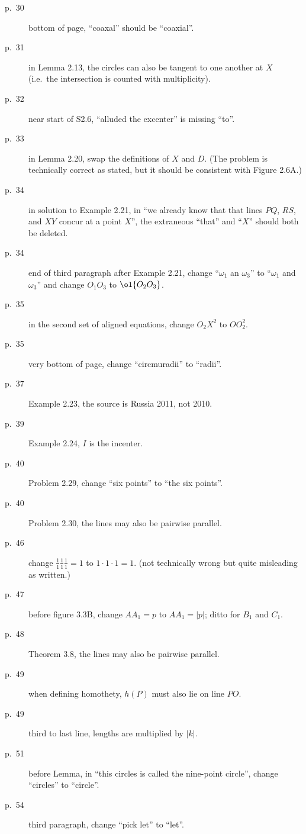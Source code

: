 \documentclass[11pt]{scrartcl}
\begin{document}
\begin{description}
\item[p.\  30] bottom of page, ``coaxal'' should be ``coaxial''.
\item[p.\  31] in Lemma 2.13, the circles can also be tangent
  to one another at $X$ (i.e.\ the intersection is counted with multiplicity).
\item[p.\  32] near start of S2.6, ``alluded the excenter'' is missing ``to''.
\item[p.\  33] in Lemma 2.20, swap the definitions of $X$ and $D$.
  (The problem is technically correct as stated,
  but it should be consistent with Figure 2.6A.)
\item[p.\  34] in solution to Example 2.21, in
  ``we already know that that lines $PQ$, $RS$, and $XY$ concur at a point $X$'',
  the extraneous ``that'' and ``$X$'' should both be deleted.
\item[p.\  34] end of third paragraph after Example 2.21,
  change ``$\omega_1$ an $\omega_3$'' to ``$\omega_1$ and $\omega_3$''
  and change $O_1O_3$ to $\ol{O_2O_3}$.
\item[p.\  35] in the second set of aligned equations,
  change $O_2X^2$ to $OO_2^2$.
\item[p.\  35] very bottom of page, change ``circmuradii'' to ``radii''.
\item[p.\  37] Example 2.23, the source is Russia 2011, not 2010.
\item[p.\  39] Example 2.24, $I$ is the incenter.
\item[p.\  40] Problem 2.29, change ``six points'' to ``the six points''.
\item[p.\  40] Problem 2.30, the lines may also be pairwise parallel.
\item[p.\  46] change $\frac 11 \frac 11 \frac 11 = 1$ to $1 \cdot 1 \cdot 1 = 1$.
  (not technically wrong but quite misleading as written.)
\item[p.\  47] before figure 3.3B, change $AA_1=p$ to $AA_1=|p|$; ditto for $B_1$ and $C_1$.
\item[p.\  48] Theorem 3.8, the lines may also be pairwise parallel.
\item[p.\  49] when defining homothety, $h(P)$ must also lie on line $PO$.
\item[p.\  49] third to last line, lengths are multiplied by $|k|$.
\item[p.\  51] before Lemma, in ``this circles is called the nine-point circle'',
  change ``circles'' to ``circle''.
\item[p.\  54] third paragraph, change ``pick let'' to ``let''.

\end{description}
\end{document}
